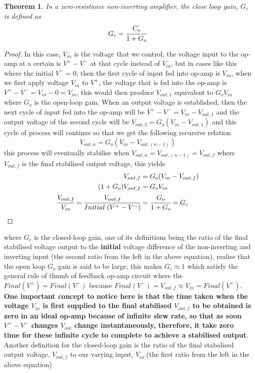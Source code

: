 \documentclass{article}
\newtheorem{theorem}{Theorem}[subsection]
\begin{document}
 \begin{theorem}
 In a zero-resistance non-inverting amplifier, the close loop gain, $G_c$ is defined as $$G_c=\cfrac{C_o}{1+G_o}$$
 \end{theorem}
 \begin{proof}
 In this case, $V_{in}$ is the voltage that we control, the voltage input to the op-amp at a certain is $V^+-V^-$ at that cycle instead of $V_{in}$, but in cases like this where the initial $V^-=0$, then the first cycle of input fed into op-amp is $V_{in}$, when we first apply voltage $V_{in}$ to $V^+$, the voltage that is fed into the op-amp is $V^+-V^-=V_{in}-0=V_{in}$, this would then produce $V_{out,1}$ equivalent to $G_oV_{in}$ where $G_o$ is the open-loop gain. When an output voltage is established, then the next cycle of input fed into the op-amp will be $V^+-V^-=V_{in}-V_{out,1}$ and the output voltage of the second cycle will be $V_{out,2}=G_o(V_{in}-V_{out,1})$ and this cycle of process will continue  so that we get the following recursive relation
 $$V_{out,n}=G_o(V_{in}-V_{out, (n-1)})$$
 this process will eventually stabilise when $V_{out,n}=V_{out,(n-1)}=V_{out,f}$ where $V_{out,f}$ is the final stabilised output voltage, this yields
 \begin{align*}
     V_{out,f} &=G_o(V_{in}-V_{out,f})\\
     (1+G_o)V_{out,f} & =G_oV_{in}\\
     \cfrac{V_{out,f}}{V_{in}}=\cfrac{V_{out,f}}{Initial \; (V^+-V^-)}& =\cfrac{G_o}{1+G_o}=G_c
 \end{align*}
 \end{proof}
 where $G_c$ is the closed-loop gain, one of its definitions being the ratio of the final stabilised voltage output to the \textbf{initial} voltage difference of the non-inverting and inverting input (the second ratio from the left in the above equation), realise that the open loop $G_o$ gain is said to be large, this makes $G_c\approx 1$ which satisfy the general rule of thumb of feedback op-amp circuit where the $Final(V^+)=Final(V^-)$ because $Final(V^-)=V_{out,f}\approx V_{in}=Final(V^+)$. \textbf{One important concept to notice here is that the time taken when the voltage $V_{in}$ is first supplied to the final stabilised $V_{out,f}$ to be obtained is zero in an ideal op-amp because of infinite slew rate, so that as soon $V^+-V^-$ changes $V_{out}$ change instantaneously, therefore, it take zero time for these infinite cycle to complete to achieve a stabilised output}. Another definition for the closed-loop gain is the ratio of the final stabalised output voltage, $V_{out,f}$ to our varying input, $V_{in}$.(the first ratio from the left in the above equation)
\end{document}
